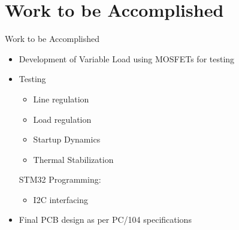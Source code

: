 \documentclass[aspectratio=169]{beamer}
\begin{document}
	\section{Work to be Accomplished}
							\begin{frame}{Work to be Accomplished}
		\begin{itemize}
			\item Development of Variable Load using MOSFETs for testing
			\item  Testing
			\begin{itemize}
				\item Line regulation
				\item Load regulation
				\item Startup Dynamics
				\item Thermal Stabilization
		\end{itemize}
	STM32 Programming:
			\begin{itemize}
				\item I2C interfacing
			\end{itemize}
				\item Final PCB design as per PC/104 specifications
			
		\end{itemize}
	\end{frame}
	
	

			
				
		
				
\end{document}
